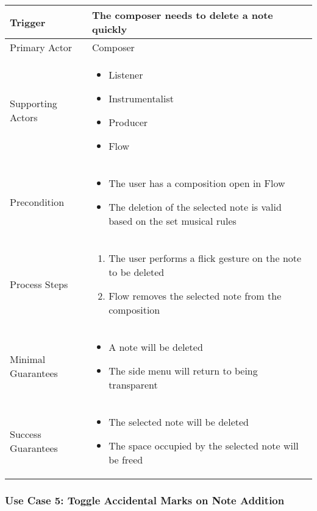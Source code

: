 \begin{tabularx}{\textwidth}{|X|X|}
\hline
Trigger & 
The composer needs to delete a note quickly \\
\hline
Primary Actor & 
Composer\\
\hline
Supporting Actors & 
\begin{itemize}
\item Listener
\item Instrumentalist
\item Producer
\item Flow
\end{itemize} \\
\hline
Precondition & 
\begin{itemize}
\item The user has a composition open in Flow 
\item The deletion of the selected note is valid based on the set musical rules
\end{itemize} \\
\hline
Process Steps & 
\begin{enumerate}
\item The user performs a flick gesture on the note to be deleted
\item Flow removes the selected note from the composition
\end{enumerate} \\
\hline
Minimal Guarantees & 
\begin{itemize}
  \item A note will be deleted
  \item The side menu will return to being transparent
\end{itemize} \\
\hline
Success Guarantees & 
\begin{itemize}
  \item The selected note will be deleted
  \item The space occupied by the selected note will be freed
\end{itemize} \\
\hline
\end{tabularx}

\subsubsection{Use Case 5: Toggle Accidental Marks on Note Addition}


